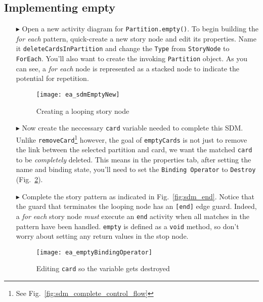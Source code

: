 \newpage
\hypertarget{emptyPartition vis}{}
\subsection{Implementing empty}
\visHeader

\begin{itemize}

\item[$\blacktriangleright$] Open a new activity diagram for \texttt{Partition.empty()}. To begin building the \emph{for each} pattern, quick-create a new story
node and edit its properties. Name it \texttt{deleteCardsInPartition} and change the \texttt{Type} from \texttt{StoryNode} to \texttt{ForEach}. You'll also want
to create the invoking \texttt{Partition} object. As you can see, a \emph{for each} node is represented as a stacked node to
indicate the potential for repetition.

\begin{figure}[htbp]
\begin{center}
  \texttt{[image: ea\_sdmEmptyNew]}
  \caption{Creating a looping story node}  
  \label{fig:sdm_foreach}
\end{center}
\end{figure}

\item[$\blacktriangleright$] Now create the neccessary \texttt{card} variable needed to complete this SDM. Unlike \texttt{removeCard}\footnote{See
Fig.~\ref{fig:sdm_complete_control_flow}} however, the goal of \texttt{emptyCards} is not just to remove the link between the selected partition and card, we
want the matched \texttt{card} to be \emph{completely} deleted. This means in the properties tab, after setting the name and binding state, you'll need to set
the \texttt{Binding Operator} to \texttt{Destroy} (Fig.~\ref{fig:sdm_bindingOperator}).

\item[$\blacktriangleright$] Complete the story pattern as indicated in Fig.~\ref{fig:sdm_end}. Notice that the guard that terminates the looping node has an
\texttt{[end]} edge guard. Indeed, a \emph{for each} story node \emph{must} execute an \texttt{end} activity when all matches in the pattern have been
handled. \texttt{empty} is defined as a \texttt{void} method, so don't worry about setting any return values in the stop node.

\begin{figure}[htbp]
\begin{center}
  \texttt{[image: ea\_emptyBindingOperator]}
  \caption{Editing \texttt{card} so the variable gets destroyed}  
  \label{fig:sdm_bindingOperator}
\end{center}
\end{figure}


\end{itemize}
